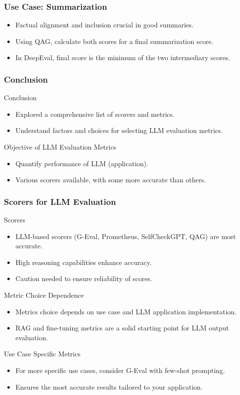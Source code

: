 \begin{frame}[fragile]\frametitle{Use Case: Summarization}
  \begin{itemize}
    \item Factual alignment and inclusion crucial in good summaries.
    \item Using QAG, calculate both scores for a final summarization score.
    \item In DeepEval, final score is the minimum of the two intermediary scores.
  \end{itemize}
\end{frame}

\begin{frame}[fragile]\frametitle{Conclusion}
Conclusion
  \begin{itemize}
    \item Explored a comprehensive list of scorers and metrics.
    \item Understand factors and choices for selecting LLM evaluation metrics.
  \end{itemize}
Objective of LLM Evaluation Metrics
  \begin{itemize}
    \item Quantify performance of LLM (application).
    \item Various scorers available, with some more accurate than others.
  \end{itemize}
\end{frame}

\begin{frame}[fragile]\frametitle{Scorers for LLM Evaluation}
Scorers
  \begin{itemize}
    \item LLM-based scorers (G-Eval, Prometheus, SelfCheckGPT, QAG) are most accurate.
    \item High reasoning capabilities enhance accuracy.
    \item Caution needed to ensure reliability of scores.
  \end{itemize}
Metric Choice Dependence
  \begin{itemize}
    \item Metrics choice depends on use case and LLM application implementation.
    \item RAG and fine-tuning metrics are a solid starting point for LLM output evaluation.
  \end{itemize}
Use Case Specific Metrics
  \begin{itemize}
    \item For more specific use cases, consider G-Eval with few-shot prompting.
    \item Ensures the most accurate results tailored to your application.
  \end{itemize}
\end{frame}
